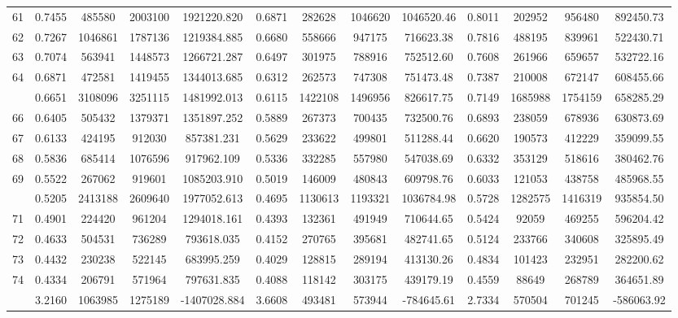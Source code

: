 \documentclass[
  12pt,
]{article}
\begin{document}
\begin{longtable}[t]{lcccccccccccc}
61 & 0.7455 & 485580 & 2003100 & 1921220.820 & 0.6871 & 282628 & 1046620 & 1046520.46 & 0.8011 & 202952 & 956480 & 892450.73\\
62 & 0.7267 & 1046861 & 1787136 & 1219384.885 & 0.6680 & 558666 & 947175 & 716623.38 & 0.7816 & 488195 & 839961 & 522430.71\\
63 & 0.7074 & 563941 & 1448573 & 1266721.287 & 0.6497 & 301975 & 788916 & 752512.60 & 0.7608 & 261966 & 659657 & 532722.16\\
64 & 0.6871 & 472581 & 1419455 & 1344013.685 & 0.6312 & 262573 & 747308 & 751473.48 & 0.7387 & 210008 & 672147 & 608455.66\\
\addlinespace
65 & 0.6651 & 3108096 & 3251115 & 1481992.013 & 0.6115 & 1422108 & 1496956 & 826617.75 & 0.7149 & 1685988 & 1754159 & 658285.29\\
66 & 0.6405 & 505432 & 1379371 & 1351897.252 & 0.5889 & 267373 & 700435 & 732500.76 & 0.6893 & 238059 & 678936 & 630873.69\\
67 & 0.6133 & 424195 & 912030 & 857381.231 & 0.5629 & 233622 & 499801 & 511288.44 & 0.6620 & 190573 & 412229 & 359099.55\\
68 & 0.5836 & 685414 & 1076596 & 917962.109 & 0.5336 & 332285 & 557980 & 547038.69 & 0.6332 & 353129 & 518616 & 380462.76\\
69 & 0.5522 & 267062 & 919601 & 1085203.910 & 0.5019 & 146009 & 480843 & 609798.76 & 0.6033 & 121053 & 438758 & 485968.55\\
\addlinespace
70 & 0.5205 & 2413188 & 2609640 & 1977052.613 & 0.4695 & 1130613 & 1193321 & 1036784.98 & 0.5728 & 1282575 & 1416319 & 935854.50\\
71 & 0.4901 & 224420 & 961204 & 1294018.161 & 0.4393 & 132361 & 491949 & 710644.65 & 0.5424 & 92059 & 469255 & 596204.42\\
72 & 0.4633 & 504531 & 736289 & 793618.035 & 0.4152 & 270765 & 395681 & 482741.65 & 0.5124 & 233766 & 340608 & 325895.49\\
73 & 0.4432 & 230238 & 522145 & 683995.259 & 0.4029 & 128815 & 289194 & 413130.26 & 0.4834 & 101423 & 232951 & 282200.62\\
74 & 0.4334 & 206791 & 571964 & 797631.835 & 0.4088 & 118142 & 303175 & 439179.19 & 0.4559 & 88649 & 268789 & 364651.89\\
\addlinespace
75 & 3.2160 & 1063985 & 1275189 & -1407028.884 & 3.6608 & 493481 & 573944 & -784645.61 & 2.7334 & 570504 & 701245 & -586063.92\\*
\end{longtable}
\endgroup{}
\end{document}
